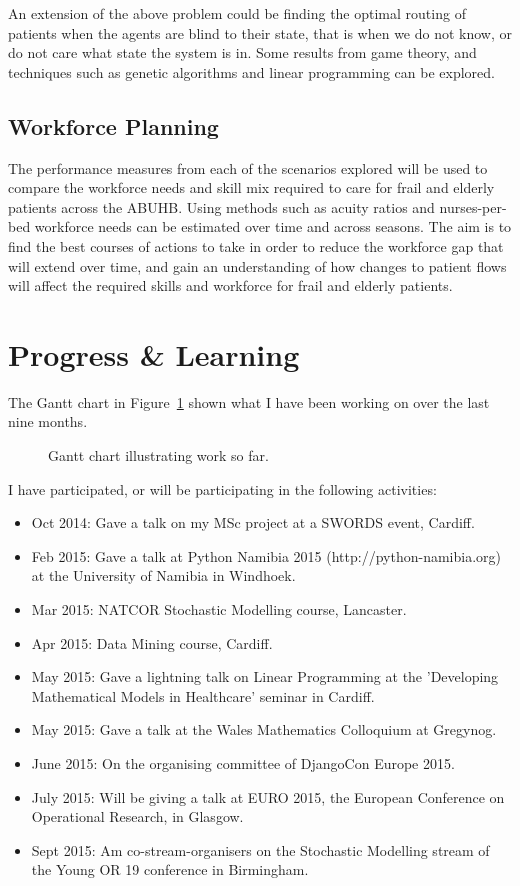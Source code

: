 \documentclass{article}
\begin{document}
An extension of the above problem could be finding the optimal routing of patients when the agents are blind to their state, that is when we do not know, or do not care what state the system is in.
Some results from game theory, and techniques such as genetic algorithms and linear programming can be explored.

\subsection{Workforce Planning}
The performance measures from each of the scenarios explored will be used to compare the workforce needs and skill mix required to care for frail and elderly patients across the ABUHB.
Using methods such as acuity ratios and nurses-per-bed workforce needs can be estimated over time and across seasons.
The aim is to find the best courses of actions to take in order to reduce the workforce gap that will extend over time, and gain an understanding of how changes to patient flows will affect the required skills and workforce for frail and elderly patients.




\section{Progress \& Learning}

The Gantt chart in Figure~\ref{fig:progressgantt} shown what I have been working on over the last nine months.

\begin{figure}
    
    \caption{Gantt chart illustrating work so far.}
    \label{fig:progressgantt}
\end{figure}

I have participated, or will be participating in the following activities:
\begin{itemize}
    \item Oct 2014: Gave a talk on my MSc project at a SWORDS event, Cardiff.
    \item Feb 2015: Gave a talk at Python Namibia 2015 (http://python-namibia.org) at the University of Namibia in Windhoek.
    \item Mar 2015: NATCOR Stochastic Modelling course, Lancaster.
    \item Apr 2015: Data Mining course, Cardiff.
    \item May 2015: Gave a lightning talk on Linear Programming at the 'Developing Mathematical Models in Healthcare' seminar in Cardiff.
    \item May 2015: Gave a talk at the Wales Mathematics Colloquium at Gregynog.
    \item June 2015: On the organising committee of DjangoCon Europe 2015.
    \item July 2015: Will be giving a talk at EURO 2015, the European Conference on Operational Research, in Glasgow.
    \item Sept 2015: Am co-stream-organisers on the Stochastic Modelling stream of the Young OR 19 conference in Birmingham.
\end{itemize}
\end{document}
